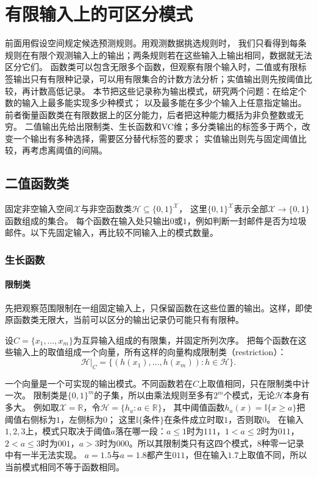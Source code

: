 \section{有限输入上的可区分模式}
\label{sec:comb-label-family-capacity}

前面用假设空间规定候选预测规则。用观测数据挑选规则时，
我们只看得到每条规则在有限个观测输入上的输出；两条规则若在这些输入上输出相同，数据就无法区分它们。
函数类可以包含无限多个函数，但观察有限个输入时，二值或有限标签输出只有有限种记录，可以用有限集合的计数方法分析；实值输出则先按阈值比较，再计数高低记录。
本节把这些记录称为输出模式，研究两个问题：在给定个数的输入上最多能实现多少种模式；
以及最多能在多少个输入上任意指定输出。前者衡量函数类在有限数据上的区分能力，后者把这种能力概括为非负整数或无穷。
二值输出先给出限制类、生长函数和VC维；多分类输出的标签多于两个，改变一个输出有多种选择，需要区分替代标签的要求；
实值输出则先与固定阈值比较，再考虑离阈值的间隔。

\subsection{二值函数类}
\label{sec:comb-vc-growth}

固定非空输入空间$\mathcal X$与非空函数类$\mathcal H\subseteq\{0,1\}^{\mathcal X}$，
这里$\{0,1\}^{\mathcal X}$表示全部$\mathcal X\to\{0,1\}$函数组成的集合。
每个函数在输入处只输出$0$或$1$，例如判断一封邮件是否为垃圾邮件。以下先固定输入，再比较不同输入上的模式数量。

\subsubsection{生长函数}
\label{sec:comb-binary-restrictions}

\paragraph{限制类}

先把观察范围限制在一组固定输入上，只保留函数在这些位置的输出。这样，即使原函数类无限大，当前可以区分的输出记录仍可能只有有限种。

\begin{definition}[限制类]
设$C=\{x_1,\ldots,x_m\}$为互异输入组成的有限集，并固定所列次序。
把每个函数在这些输入上的取值组成一个向量，所有这样的向量构成限制类（restriction）：
\[
 \mathcal H|_C=\{(h(x_1),\ldots,h(x_m)):h\in\mathcal H\}.
\]
\end{definition}
一个向量是一个可实现的输出模式。不同函数若在$C$上取值相同，只在限制类中计一次。
限制类是$\{0,1\}^m$的子集，所以由乘法规则至多有$2^m$个模式，无论$\mathcal H$本身有多大。
例如取$\mathcal X=\mathbb R$，令$\mathcal H=\{h_a:a\in\mathbb R\}$，
其中阈值函数$h_a(x)=\mathbb I\{x\geq a\}$把阈值右侧标为$1$，左侧标为$0$；
这里$\mathbb I\{\text{条件}\}$在条件成立时取$1$，否则取$0$。
在输入$1,2,3$上，模式只取决于阈值$a$落在哪一段：$a\leq1$时为$111$，$1<a\leq2$时为$011$，
$2<a\leq3$时为$001$，$a>3$时为$000$。所以其限制类只有这四个模式，$8$种零一记录中有一半无法实现。
$a=1.5$与$a=1.8$都产生$011$，但在输入$1.7$上取值不同，所以当前模式相同不等于函数相同。

